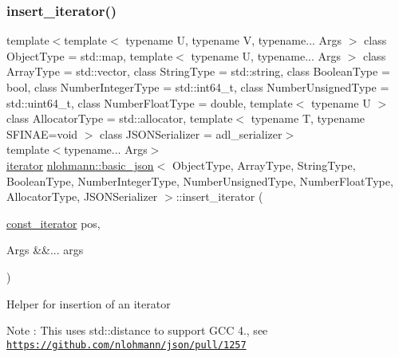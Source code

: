 \subsubsection{\texorpdfstring{insert\+\_\+iterator()}{insert\_iterator()}}
{\footnotesize\ttfamily template$<$template$<$ typename U, typename V, typename... Args $>$ class Object\+Type = std\+::map, template$<$ typename U, typename... Args $>$ class Array\+Type = std\+::vector, class String\+Type  = std\+::string, class Boolean\+Type  = bool, class Number\+Integer\+Type  = std\+::int64\+\_\+t, class Number\+Unsigned\+Type  = std\+::uint64\+\_\+t, class Number\+Float\+Type  = double, template$<$ typename U $>$ class Allocator\+Type = std\+::allocator, template$<$ typename T, typename S\+F\+I\+N\+A\+E=void $>$ class J\+S\+O\+N\+Serializer = adl\+\_\+serializer$>$ \\
template$<$typename... Args$>$ \\
\mbox{\hyperlink{classnlohmann_1_1basic__json_a099316232c76c034030a38faa6e34dca}{iterator}} \mbox{\hyperlink{classnlohmann_1_1basic__json}{nlohmann\+::basic\+\_\+json}}$<$ Object\+Type, Array\+Type, String\+Type, Boolean\+Type, Number\+Integer\+Type, Number\+Unsigned\+Type, Number\+Float\+Type, Allocator\+Type, J\+S\+O\+N\+Serializer $>$\+::insert\+\_\+iterator (\begin{DoxyParamCaption}\item[{\mbox{\hyperlink{classnlohmann_1_1basic__json_a41a70cf9993951836d129bb1c2b3126a}{const\+\_\+iterator}}}]{pos,  }\item[{Args \&\&...}]{args }\end{DoxyParamCaption})\hspace{0.3cm}{\ttfamily [inline]}}

Helper for insertion of an iterator \begin{DoxyNote}{Note}
\+: This uses std\+::distance to support G\+CC 4., see \href{https://github.com/nlohmann/json/pull/1257}{\tt https\+://github.\+com/nlohmann/json/pull/1257} 
\end{DoxyNote}
\mbox{\label{classnlohmann_1_1basic__json_aef9ce5dd2381caee1f8ddcdb5bdd9c65}} 
